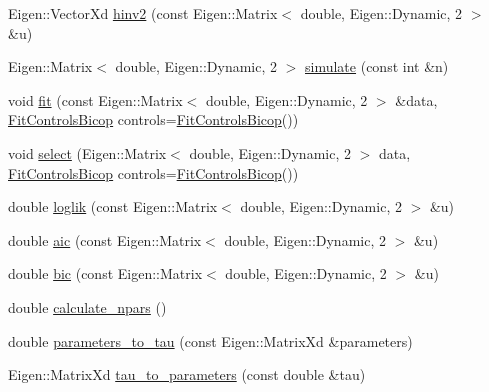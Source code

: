\begin{DoxyCompactItemize}
\item 
Eigen\+::\+Vector\+Xd \hyperlink{classvinecopulib_1_1_bicop_a3e33ec227b6b7182e327399201cad382}{hinv2} (const Eigen\+::\+Matrix$<$ double, Eigen\+::\+Dynamic, 2 $>$ \&u)
\item 
Eigen\+::\+Matrix$<$ double, Eigen\+::\+Dynamic, 2 $>$ \hyperlink{classvinecopulib_1_1_bicop_aeb87bea4283dacfa5e609356c020f85d}{simulate} (const int \&n)
\item 
void \hyperlink{classvinecopulib_1_1_bicop_a2d509a8b404a73ef17f04a0678e90a71}{fit} (const Eigen\+::\+Matrix$<$ double, Eigen\+::\+Dynamic, 2 $>$ \&data, \hyperlink{classvinecopulib_1_1_fit_controls_bicop}{Fit\+Controls\+Bicop} controls=\hyperlink{classvinecopulib_1_1_fit_controls_bicop}{Fit\+Controls\+Bicop}())
\item 
void \hyperlink{classvinecopulib_1_1_bicop_af20af5c3ba6565628987b4784e9ac348}{select} (Eigen\+::\+Matrix$<$ double, Eigen\+::\+Dynamic, 2 $>$ data, \hyperlink{classvinecopulib_1_1_fit_controls_bicop}{Fit\+Controls\+Bicop} controls=\hyperlink{classvinecopulib_1_1_fit_controls_bicop}{Fit\+Controls\+Bicop}())
\item 
double \hyperlink{classvinecopulib_1_1_bicop_ae8bcc0c3265cc86565333a0cfd3d619d}{loglik} (const Eigen\+::\+Matrix$<$ double, Eigen\+::\+Dynamic, 2 $>$ \&u)
\item 
double \hyperlink{classvinecopulib_1_1_bicop_a9287fec95519fea64a2ae80f5888c709}{aic} (const Eigen\+::\+Matrix$<$ double, Eigen\+::\+Dynamic, 2 $>$ \&u)
\item 
double \hyperlink{classvinecopulib_1_1_bicop_ac1f480d13b3464260c2dd6aa88b2e130}{bic} (const Eigen\+::\+Matrix$<$ double, Eigen\+::\+Dynamic, 2 $>$ \&u)
\item 
double \hyperlink{classvinecopulib_1_1_bicop_a9f3b3b83c54a9e1d809fdee058f3eb11}{calculate\+\_\+npars} ()
\item 
double \hyperlink{classvinecopulib_1_1_bicop_a1390070f8ae6b6995bbdaf34cd7ea887}{parameters\+\_\+to\+\_\+tau} (const Eigen\+::\+Matrix\+Xd \&parameters)
\item 
Eigen\+::\+Matrix\+Xd \hyperlink{classvinecopulib_1_1_bicop_a5809ddc9884f6fb66fe53289be348913}{tau\+\_\+to\+\_\+parameters} (const double \&tau)
\end{DoxyCompactItemize}
